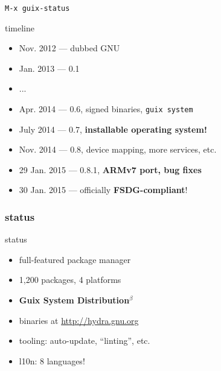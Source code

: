 \documentclass{beamer}
\begin{document}
\begin{frame}[plain]
  \hspace{-0.5cm}
  \Huge{\alert{\texttt{M-x guix-status}}}
\end{frame}

\begin{frame}{timeline}
  \begin{itemize}
    \item Nov. 2012 --- dubbed GNU
    \item{Jan. 2013 --- \alert{0.1}}
    \item ...
    \item{Apr. 2014 --- \alert{0.6}, signed binaries, \texttt{guix
        system}}
    \item{July 2014 --- \alert{0.7}, \textbf{installable operating
        system!}}
    \item{Nov. 2014 --- \alert{0.8}, device mapping, more services,
      etc.}
    \item<2->{29 Jan. 2015 --- \alert{0.8.1}, \textbf{ARMv7 port, bug
        fixes}}
    \item<3->{30 Jan. 2015 --- officially \textbf{FSDG-compliant}!}
  \end{itemize}
\end{frame}


\begin{frame}[plain]
  \frametitle{status}
\end{frame}

\begin{frame}{status}
  \Large{
  \begin{itemize}
    \item full-featured package manager
    \item 1,200 packages, 4 platforms
    \item \textbf{Guix System Distribution$^\beta$}
    \item binaries at \url{http://hydra.gnu.org}
    \item tooling: auto-update, ``linting'', etc.
    \item l10n: 8 languages!
  \end{itemize}}
\end{frame}
\end{document}
